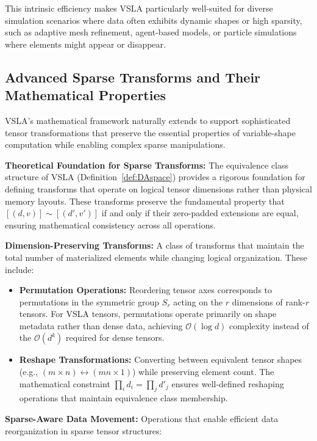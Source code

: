 This intrinsic efficiency makes VSLA particularly well-suited for diverse simulation scenarios where data often exhibits dynamic shapes or high sparsity, such as adaptive mesh refinement, agent-based models, or particle simulations where elements might appear or disappear.

\subsection{Advanced Sparse Transforms and Their Mathematical Properties}

VSLA's mathematical framework naturally extends to support sophisticated tensor transformations that preserve the essential properties of variable-shape computation while enabling complex sparse manipulations.

\textbf{Theoretical Foundation for Sparse Transforms:} The equivalence class structure of VSLA (Definition~\ref{def:DAspace}) provides a rigorous foundation for defining transforms that operate on logical tensor dimensions rather than physical memory layouts. These transforms preserve the fundamental property that $[(d,v)] \sim [(d',v')]$ if and only if their zero-padded extensions are equal, ensuring mathematical consistency across all operations.

\textbf{Dimension-Preserving Transforms:} A class of transforms that maintain the total number of materialized elements while changing logical organization. These include:

\begin{itemize}
\item \textbf{Permutation Operations:} Reordering tensor axes corresponds to permutations in the symmetric group $S_r$ acting on the $r$ dimensions of rank-$r$ tensors. For VSLA tensors, permutations operate primarily on shape metadata rather than dense data, achieving $\mbox{$\mathcal{O}(\log d)$}$ complexity instead of the $\mbox{$\mathcal{O}(d^k)$}$ required for dense tensors.

\item \textbf{Reshape Transformations:} Converting between equivalent tensor shapes (e.g., $(m \times n) \leftrightarrow (mn \times 1)$) while preserving element count. The mathematical constraint $\prod_i d_i = \prod_j d'_j$ ensures well-defined reshaping operations that maintain equivalence class membership.
\end{itemize}

\textbf{Sparse-Aware Data Movement:} Operations that enable efficient data reorganization in sparse tensor structures:

